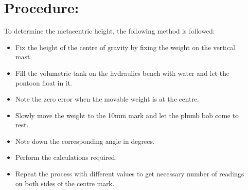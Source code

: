 \documentclass[12pt,a4paper]{article}
\begin{document}
\section{Procedure:}
To determine the metacentric height, the following method is followed:
\begin{itemize}
\item Fix the height of the centre of gravity by fixing the weight on the vertical mast.
\item Fill the volumetric tank on the hydraulics bench with water and let the pontoon float in it.
\item Note the zero error when the movable weight is at the centre.
\item Slowly move the weight to the 10mm mark and let the plumb bob come to rest.
\item Note down the corresponding angle in degrees.
\item Perform the calculations required.
\item Repeat the process with different values to get necessary number of readings on both sides of the centre mark.
\end{itemize}
\end{document}
